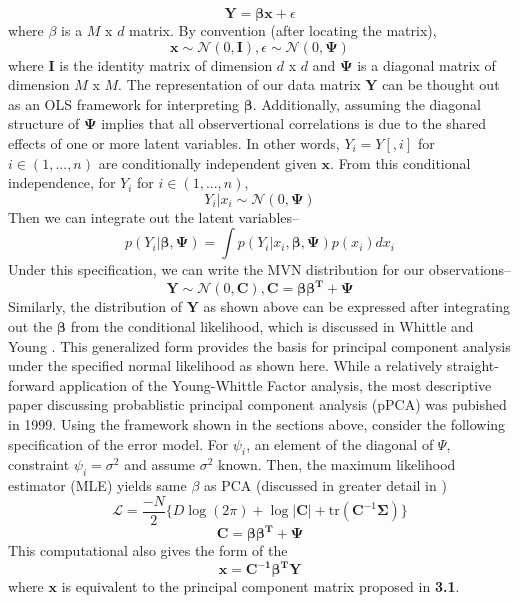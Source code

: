 \documentclass[english, 11pt]{article}\usepackage[]{graphicx}\usepackage[]{color}
\begin{document}
$$ \mathbf{Y = \beta x} + \epsilon$$
where $\beta$ is a $M$ x $d$ matrix. 
\newline \newline
By convention (after locating the matrix), $$\mathbf{x} \sim \mathcal{N} (0, \mathbf{I}), \epsilon \sim \mathcal{N} (0, \mathbf{\Psi})$$
where $\mathbf{I}$ is the identity matrix of dimension $d$ x $d$ and $\mathbf{\Psi}$ is a diagonal matrix of dimension $M$ x $M$. The representation of our data matrix $\mathbf{Y}$ can be thought out as an OLS framework for interpreting $\mathbf{\beta}$. Additionally, assuming the diagonal structure of $\mathbf{\Psi}$ implies that all observertional correlations is due to the shared effects of one or more latent variables. In other words, $Y_i = Y[,i]$ for $i \in (1, ..., n)$ are conditionally independent given $\mathbf{x}$. 
\newline \newline
From this conditional independence, for $Y_i$ for $i \in (1, ..., n)$, $$Y_i |x_i \sim  \mathcal{N} (0, \mathbf{\Psi})$$
Then we can integrate out the latent variables--
$$p( Y_i |\mathbf{\beta}, \mathbf{\Psi})= \int p( Y_i | x_i , \mathbf{\beta, \Psi}) p(x_i) dx_i  $$
Under this specification, we can write the MVN distribution for our observations-- $$\mathbf{Y} \sim  \mathcal{N} (0, \mathbf{C}), \mathbf{C} = \mathbf{\beta \beta^T }+ \mathbf{\Psi}  $$
Similarly, the distribution of $\mathbf{Y}$ as shown above can be expressed after integrating out the $\mathbf{\beta}$ from the conditional likelihood, which is discussed in Whittle \cite{whittle1952principal} and Young \cite{young1941maximum}. This generalized form provides the basis for principal component analysis under the specified normal likelihood as shown here. 
\newline \newline
While a relatively straight-forward application of the Young-Whittle Factor analysis, the most descriptive paper discussing probablistic principal component analysis (pPCA) was pubished in 1999. \cite{tipping1999probabilistic} Using the framework shown in the sections above, consider the following specification of the error model. For $\psi_i$, an element of the diagonal of $\Psi$, constraint $\psi_i = \sigma^2$ and assume $\sigma^2$ known. Then, the maximum likelihood estimator (MLE) yields same $\beta$ as PCA (discussed in greater detail in \cite{tipping1999probabilistic})
$$  \mathcal{L} = \frac{-N}{2}\{ D\log(2\pi) + \log|\mathbf{C}| + \textrm{tr}(\mathbf{C}^{-1}\mathbf{\Sigma})  \}   $$
$$\mathbf{C} = \mathbf{\beta\beta^T }+ \mathbf{\Psi} $$
This computational also gives the form of the 
$$  \mathbf{x} = \mathbf{C^{-1}\beta^{T}Y}$$
where $\mathbf{x}$ is equivalent to the principal component matrix proposed in \textbf{3.1}.
\end{document}

